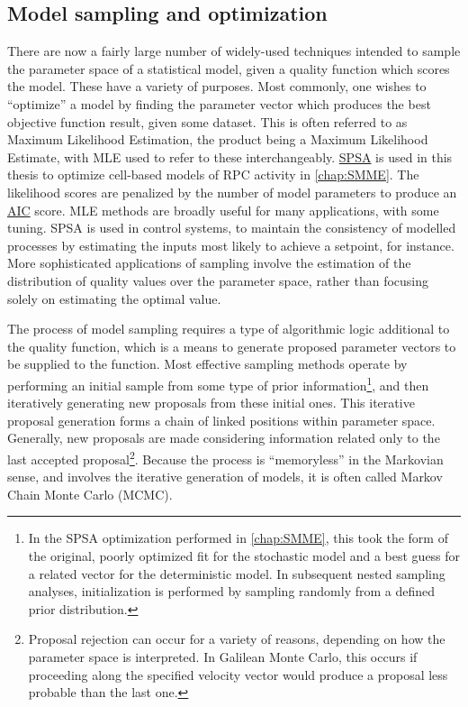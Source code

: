 \subsection{Model sampling and optimization}
\label{sampleoptim}
There are now a fairly large number of widely-used techniques intended to sample the parameter space of a statistical model, given a quality function which scores the model. These have a variety of purposes. Most commonly, one wishes to ``optimize'' a model by finding the parameter vector which produces the best objective function result, given some dataset. This is often referred to as Maximum Likelihood Estimation, the product being a Maximum Likelihood Estimate, with MLE used to refer to these interchangeably. \hyperref[SPSA]{SPSA} is used in this thesis to optimize cell-based models of RPC activity in \autoref{chap:SMME}. The likelihood scores are penalized by the number of model parameters to produce an \hyperref[AIC]{AIC} score. MLE methods are broadly useful for many applications, with some tuning. SPSA is used in control systems, to maintain the consistency of modelled processes by estimating the inputs most likely to achieve a setpoint, for instance. More sophisticated applications of sampling involve the estimation of the distribution of quality values over the parameter space, rather than focusing solely on estimating the optimal value.

The process of model sampling requires a type of algorithmic logic additional to the quality function, which is a means to generate proposed parameter vectors to be supplied to the function. Most effective sampling methods operate by performing an initial sample from some type of prior information\footnote{In the SPSA optimization performed in \autoref{chap:SMME}, this took the form of the original, poorly optimized fit for the stochastic model and a best guess for a related vector for the deterministic model. In subsequent nested sampling analyses, initialization is performed by sampling randomly from a defined prior distribution.}, and then iteratively generating new proposals from these initial ones. This iterative proposal generation forms a chain of linked positions within parameter space. Generally, new proposals are made considering information related only to the last accepted proposal\footnote{Proposal rejection can occur for a variety of reasons, depending on how the parameter space is interpreted. In Galilean Monte Carlo, this occurs if proceeding along the specified velocity vector would produce a proposal less probable than the last one.}. Because the process is ``memoryless'' in the Markovian sense, and involves the iterative generation of models, it is often called Markov Chain Monte Carlo (MCMC).

